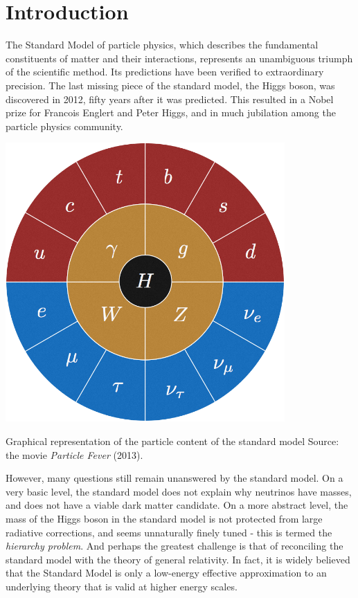 \chapter{Introduction}\label{ch:introduction}

The Standard Model of particle physics, which describes the fundamental constituents of matter and their interactions, represents an unambiguous triumph of the scientific method. Its predictions have been verified to extraordinary precision. The last missing piece of the standard model, the Higgs boson, was discovered in 2012, fifty years after it was predicted. This resulted in a Nobel prize for Francois Englert and Peter Higgs, and in much jubilation among the particle physics community. 

\begin{marginfigure}[2.5cm]
  \centering
  \includegraphics[width=0.8\textwidth]{images/SM-wheel.png}
  \caption{Graphical representation of the particle content of the standard model Source: the movie \emph{Particle Fever} (2013).}
\end{marginfigure}

However, many questions still remain unanswered by the standard model. On a very basic level, the standard model does not explain why neutrinos have masses, and does not have a viable dark matter candidate. On a more abstract level, the mass of the Higgs boson in the standard model is not protected from large radiative corrections, and seems unnaturally finely tuned - this is termed the \emph{hierarchy problem}. And perhaps the greatest challenge is that of reconciling the standard model with the theory of general relativity. In fact, it is widely believed that the Standard Model is only a low-energy effective approximation to an underlying theory that is valid at higher energy scales.


